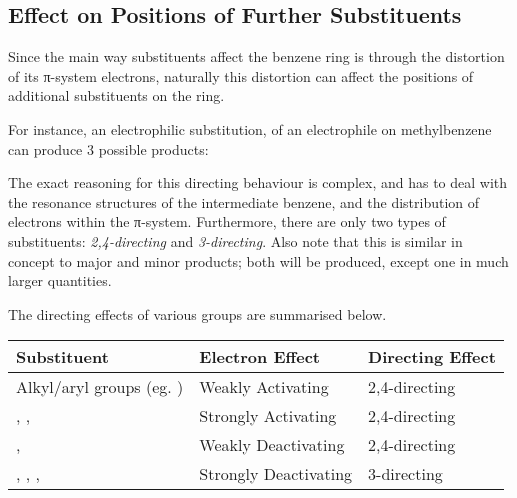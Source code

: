 		\subsection{Effect on Positions of Further Substituents}

			Since the main way substituents affect the benzene ring is through the distortion of its π-system electrons, naturally
			this distortion can affect the positions of additional substituents on the ring.

			For instance, an electrophilic substitution, of an electrophile  on methylbenzene can produce 3 possible products:


			The exact reasoning for this directing behaviour is complex, and has to deal with the resonance structures of the intermediate
			benzene, and the distribution of electrons within the π-system. Furthermore, there are only two types of substituents:
			\textit{2,4-directing} and \textit{3-directing}. Also note that this is similar in concept to major and minor products; both
			will be produced, except one in much larger quantities.

			The directing effects of various groups are summarised below.


			\begin{center}\begin{table}[htb]\renewcommand{\arraystretch}{1.5}
			\begin{tabu} to \textwidth {| X[-4,c,m] | X[c,m] | X[c,m] |}

				\hline
							Substituent						&	Electron Effect			&	Directing Effect	\\	\hline
				Alkyl/aryl groups (eg. )			&	Weakly Activating		&	2,4-directing		\\	\hline
				, , 				&	Strongly Activating		&	2,4-directing		\\	\hline
				\ch{-\Cl}, 					&	Weakly Deactivating		&	2,4-directing		\\	\hline
				, , , 	&	Strongly Deactivating	&	3-directing			\\	\hline

			\end{tabu}
			\end{table}\end{center}\vspace{-10mm}


